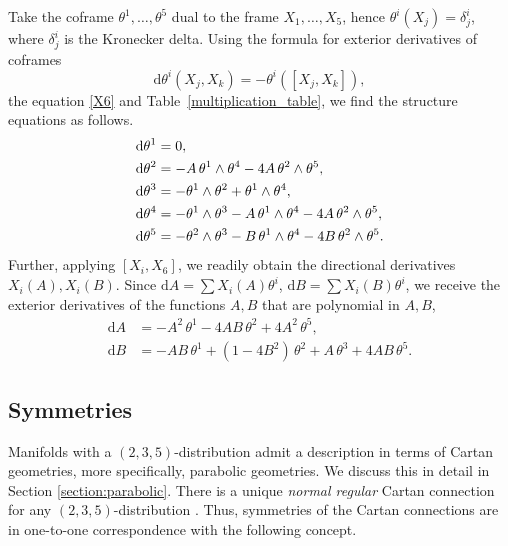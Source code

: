 \documentclass{amsart}
\theoremstyle{plain}
\theoremstyle{definition}
\theoremstyle{remark}
\newcommand{\di}{\mathrm{d}}
\begin{document}
Take the coframe $\theta^1, \dots, \theta^5$ dual to the frame $X_1, \dots, X_5$, hence $\theta^i (X_j) = \delta^i_j$, where $\delta^i_j$ is the Kronecker delta. Using the formula for exterior derivatives of coframes
    \[ \di \theta^i (X_j,X_k) = -\theta^i ([X_j,X_k]), \]
the equation \eqref{X6} and Table~\ref{multiplication_table}, we find the structure equations as follows.
\begin{equation}\label{coframe_structure_standard_1}
    \begin{aligned}
    \di \theta^1 &= 0,\\
    \di \theta^2 &= -A\, \theta^1 \wedge \theta^4 - 4 A\, \theta^2 \wedge \theta^5,\\
    \di \theta^3 &= -\theta^1 \wedge \theta^2 + \theta^1 \wedge \theta^4,\\
    \di \theta^4 &= -\theta^1 \wedge \theta^3 - A\, \theta^1 \wedge \theta^4 - 4 A\, \theta^2 \wedge \theta^5,\\
    \di \theta^5 &= -\theta^2 \wedge \theta^3 - B\, \theta^1 \wedge \theta^4 - 4 B\, \theta^2 \wedge \theta^5.
    \end{aligned}\\
\end{equation}
%
Further, applying $[X_i,X_6]$, we readily obtain the directional derivatives $X_i(A), X_i(B)$. Since $\di A = \sum X_i(A) \theta^i$, $\di B = \sum X_i(B) \theta^i$, we receive the exterior derivatives of the functions $A,B$ that are polynomial in $A,B$,
\begin{equation} \label{coframe_structure_standard_2}
    \begin{aligned}
    \di A &= -A^2\, \theta^1 - 4 A B\, \theta^2 + 4 A^2\, \theta^5,\\
    \di B &= -A B\, \theta^1 + (1 - 4B^2)\, \theta^2 + A\, \theta^3 + 4 A B\, \theta^5.
    \end{aligned}
\end{equation}

\subsection{Symmetries} \label{section:std_snake_symmetries}
Manifolds with a $(2,3,5)$-distribution admit a description in terms of Cartan geometries, more specifically, parabolic geometries. We discuss this in detail in Section \ref{section:parabolic}. There is a unique \emph{normal regular} Cartan connection for any $(2,3,5)$-distribution \cite[pp. 431-432]{parabook}. Thus, symmetries of the Cartan connections are in one-to-one correspondence with the following concept.
\end{document}

